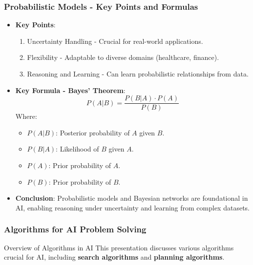 \documentclass[aspectratio=169]{beamer}
\begin{document}
\begin{frame}[fragile]
    \frametitle{Probabilistic Models - Key Points and Formulas}
    \begin{itemize}
        \item \textbf{Key Points}:
        \begin{enumerate}
            \item Uncertainty Handling - Crucial for real-world applications.
            \item Flexibility - Adaptable to diverse domains (healthcare, finance).
            \item Reasoning and Learning - Can learn probabilistic relationships from data.
        \end{enumerate}
        
        \item \textbf{Key Formula - Bayes' Theorem}:
        \begin{equation}
          P(A | B) = \frac{P(B | A) \cdot P(A)}{P(B)}
        \end{equation}
        Where:
        \begin{itemize}
            \item \(P(A | B)\): Posterior probability of \(A\) given \(B\).
            \item \(P(B | A)\): Likelihood of \(B\) given \(A\).
            \item \(P(A)\): Prior probability of \(A\).
            \item \(P(B)\): Prior probability of \(B\).
        \end{itemize}
        
        \item \textbf{Conclusion}:
        Probabilistic models and Bayesian networks are foundational in AI, enabling reasoning under uncertainty and learning from complex datasets.
    \end{itemize}
\end{frame}

\begin{frame}[fragile]
    \frametitle{Algorithms for AI Problem Solving}
    \begin{block}{Overview of Algorithms in AI}
        This presentation discusses various algorithms crucial for AI, including \textbf{search algorithms} and \textbf{planning algorithms}.
    \end{block}
\end{frame}
\end{document}
